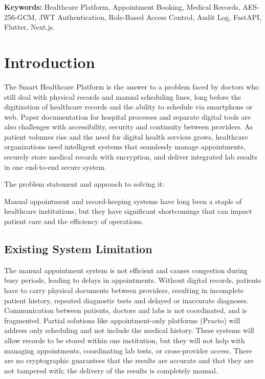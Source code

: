 \documentclass[a4paper,12pt]{report}
\begin{document}
\textbf{Keywords:} Healthcare Platform, Appointment Booking, Medical Records, AES-256-GCM, JWT Authentication, Role-Based Access Control, Audit Log, FastAPI, Flutter, Next.js.

\clearpage

\tableofcontents

\clearpage

\chapter{Introduction}

The Smart Healthcare Platform is the answer to a problem faced by doctors who still deal with physical records and manual scheduling lines, long before the digitization of healthcare records and the ability to schedule via smartphone or web. Paper documentation for hospital processes and separate digital tools are also challenges with accessibility, security and continuity between providers. As patient volumes rise and the need for digital health services grows, healthcare organizations need intelligent systems that seamlessly manage appointments, securely store medical records with encryption, and deliver integrated lab results in one end-to-end secure system.

The problem statement and approach to solving it:

Manual appointment and record-keeping systems have long been a staple of healthcare institutions, but they have significant shortcomings that can impact patient care and the efficiency of operations.

\section {Existing System Limitation}

The manual appointment system is not efficient and causes congestion during busy periods, leading to delays in appointments. Without digital records, patients have to carry physical documents between providers, resulting in incomplete patient history, repeated diagnostic tests and delayed or inaccurate diagnoses. Communication between patients, doctors and labs is not coordinated, and is fragmented. Partial solutions like appointment-only platforms (Practo) will address only scheduling and not include the medical history. These systems will allow records to be stored within one institution, but they will not help with managing appointments, coordinating lab tests, or cross-provider access. There are no cryptographic guarantees that the results are accurate and that they are not tampered with; the delivery of the results is completely manual.
\end{document}
